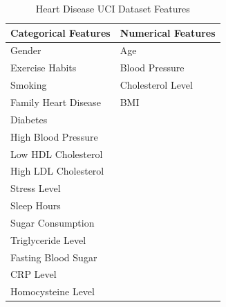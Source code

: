 \documentclass[11pt,a4paper]{article}
\begin{document}
\begin{table}[H]
    \centering
    \caption{Heart Disease UCI Dataset Features}
    \begin{tabular}{|p{}|p{}|}
        \hline
        \textbf{Categorical Features} & \textbf{Numerical Features} \\
        \hline
        Gender                        & Age                         \\
        Exercise Habits               & Blood Pressure              \\
        Smoking                       & Cholesterol Level           \\
        Family Heart Disease          & BMI                         \\
        Diabetes                      &                             \\
        High Blood Pressure           &                             \\
        Low HDL Cholesterol           &                             \\
        High LDL Cholesterol          &                             \\
        Stress Level                  &                             \\
        Sleep Hours                   &                             \\
        Sugar Consumption             &                             \\
        Triglyceride Level            &                             \\
        Fasting Blood Sugar           &                             \\
        CRP Level                     &                             \\
        Homocysteine Level            &                             \\
        \hline
    \end{tabular}
\end{table}
\end{document}
